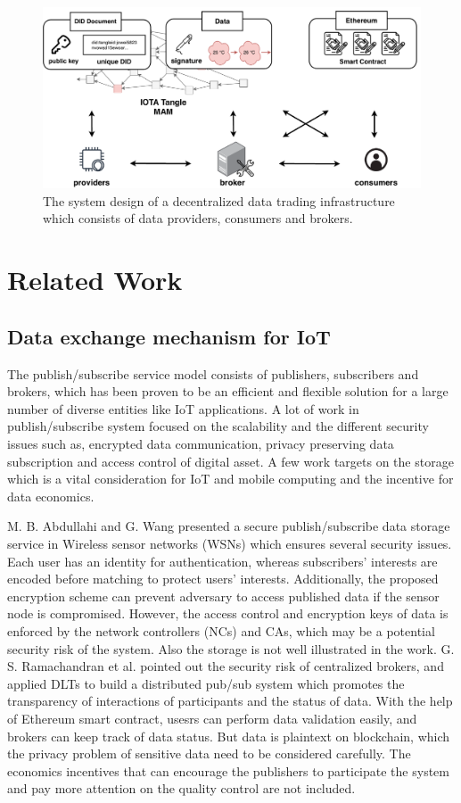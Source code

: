 \documentclass[conference]{IEEEtran}
\begin{document}
\begin{figure}[!t]
    \centering
    \includegraphics[width=3.in]{system_design}
    \caption{The system design of a decentralized data trading infrastructure which consists of data providers, consumers and brokers.}
    \label{fig:system_design}
\end{figure}

\section{Related Work}
\label{section:relatedWork}
\subsection{Data exchange mechanism for IoT}
The publish/subscribe service model consists of publishers, subscribers and brokers, which has been proven\cite{pubSubAnalysis, pubSubAnalysis2} to be an efficient and flexible solution for a large number of diverse entities like IoT applications. A lot of work in publish/subscribe system focused on the scalability and the different security issues such as, encrypted data communication, privacy preserving data subscription and access control of digital asset. A few work targets on the storage which is a vital consideration for IoT and mobile computing and the incentive for data economics.

M. B. Abdullahi and G. Wang\cite{centralPubSub} presented a secure publish/subscribe data storage service in Wireless sensor networks (WSNs) which ensures several security issues. Each user has an identity for authentication, whereas subscribers' interests are encoded before matching to protect users' interests. Additionally, the proposed encryption scheme can prevent adversary to access published data if the sensor node is compromised. However, the access control and encryption keys of data is enforced by the network controllers (NCs) and CAs, which may be a potential security risk of the system. Also the storage is not well illustrated in the work. G. S. Ramachandran et al.\cite{trinity} pointed out the security risk of centralized brokers, and applied DLTs to build a distributed pub/sub system which promotes the transparency of interactions of participants and the status of data. With the help of Ethereum smart contract, usesrs can perform data validation easily, and brokers can keep track of data status. But data is plaintext on blockchain, which the privacy problem of sensitive data need to be considered carefully. The economics incentives that can encourage the publishers to participate the system and pay more attention on the quality control are not included. 
\end{document}
